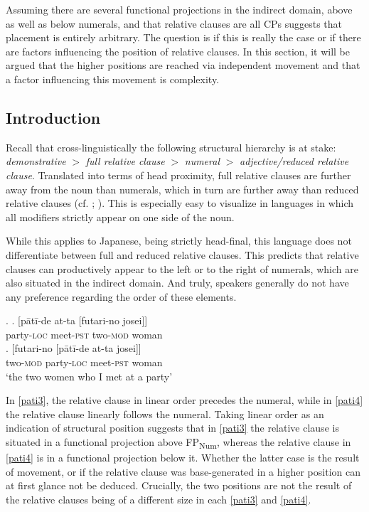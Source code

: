 \documentclass [output=book,colorlinks,citecolor=brown]{langscibook}
\begin{document}
Assuming there are several functional projections in the indirect domain, above as well as below numerals, and that relative clauses are all CPs suggests that placement is entirely arbitrary. The question is if this is really the case or if there are factors influencing the position of relative clauses. In this section, it will be argued that the higher positions are reached via independent movement and that a factor influencing this movement is complexity. %

\subsection{Introduction}

Recall that cross-linguistically the following structural hierarchy is at stake: \textit{demonstrative} $>$ \textit{full relative clause} $>$ \textit{numeral} $>$ \textit{adjective/reduced relative clause}. Translated into terms of head proximity, full relative clauses are further away from the noun than numerals, which in turn are further away than reduced relative clauses (cf. \citealt[ch. 3.5]{cinque:2020:relcl}; \citealt{cinque:2017:micro, greenberg:1963:some, hawkins:1983:word, rijkhoff:2002:noun}). This is especially easy to visualize in languages in which all modifiers strictly appear on one side of the noun.

While this applies to Japanese, being strictly head-final, this language does not differentiate between full and reduced relative clauses. This predicts that relative clauses can productively appear to the left or to the right of numerals, which are also situated in the indirect domain. And truly, speakers generally do not have any preference regarding the order of these elements. %

\newpage

\ex. \label{pati} \ag. [pātī-de at-ta [futari-no josei]]\\
party-\textsc{loc} meet-\textsc{pst} two-\textsc{mod} woman \label{pati3}\\
\bg. [futari-no [pātī-de at-ta josei]]\\
two-\textsc{mod} party-\textsc{loc} meet-\textsc{pst} woman\\
`the two women who I met at a party' \label{pati4}

In \ref{pati3}, the relative clause in linear order precedes the numeral, while in \ref{pati4} the relative clause linearly follows the numeral. Taking linear order as an indication of structural position suggests that in \ref{pati3} the relative clause is situated in a functional projection above FP\textsubscript{Num}, whereas the relative clause in \ref{pati4} is in a functional projection below it. Whether the latter case is the result of movement, or if the relative clause was base-generated in a higher position can at first glance not be deduced. Crucially, the two positions are not the result of the relative clauses being of a different size in each \ref{pati3} and \ref{pati4}.
\end{document}
